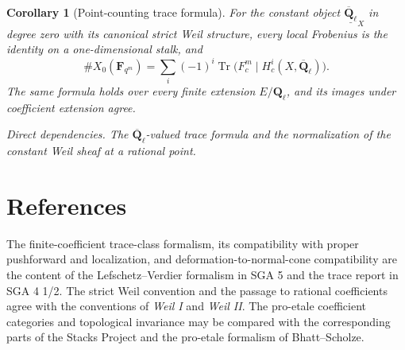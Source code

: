 \documentclass[10pt]{article}
\newtheorem{corollary}[theorem]{Corollary}
\theoremstyle{definition}
\newcommand{\Ql}{\mathbf Q_\ell}
\newcommand{\Qlb}{\overline{\mathbf Q}_\ell}
\newcommand{\Tr}{\operatorname{Tr}}
\newcommand{\depends}[1]{\par\smallskip\noindent\textit{Direct dependencies.} #1\par}
\begin{document}
\begin{corollary}[Point-counting trace formula]
For the constant object \(\underline{\Qlb}_X\) in degree zero with its canonical strict
Weil structure, every local Frobenius is the identity on a one-dimensional
stalk, and
\[
 \#X_0(\mathbf F_{q^m})
 =
 \sum_i(-1)^i\Tr
 \bigl(F_c^m\mid H_c^i(X,\Qlb)\bigr).
\]
The same formula holds over every finite extension \(E/\Ql\), and its
images under coefficient extension agree.
\depends{The \(\Qlb\)-valued trace formula and the normalization of the
constant Weil sheaf at a rational point.}
\end{corollary}

\section{References}

The finite-coefficient trace-class formalism, its compatibility with proper
pushforward and localization, and deformation-to-normal-cone compatibility are the content
of the Lefschetz--Verdier formalism in SGA 5 and the trace report in SGA
4 1/2.  The strict Weil convention and the passage to rational coefficients
agree with the conventions of \emph{Weil I} and \emph{Weil II}.  The
pro-etale coefficient categories and topological invariance may be compared
with the corresponding parts of the Stacks Project and the pro-etale
formalism of Bhatt--Scholze.
\end{document}
